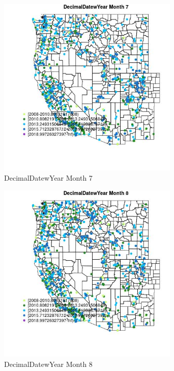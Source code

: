 \begin{figure} 
\centering  
\includegraphics[width=0.77\textwidth]{Code_Outputs/Report_ML_input_PM25_Step4_part_e_de_duplicated_aveswNAs_MapObsMo7DecimalDatewYear.jpg} 
\caption{\label{fig:Report_ML_input_PM25_Step4_part_e_de_duplicated_aveswNAsMapObsMo7DecimalDatewYear}DecimalDatewYear Month 7} 
\end{figure} 
 

\begin{figure} 
\centering  
\includegraphics[width=0.77\textwidth]{Code_Outputs/Report_ML_input_PM25_Step4_part_e_de_duplicated_aveswNAs_MapObsMo8DecimalDatewYear.jpg} 
\caption{\label{fig:Report_ML_input_PM25_Step4_part_e_de_duplicated_aveswNAsMapObsMo8DecimalDatewYear}DecimalDatewYear Month 8} 
\end{figure} 
 

